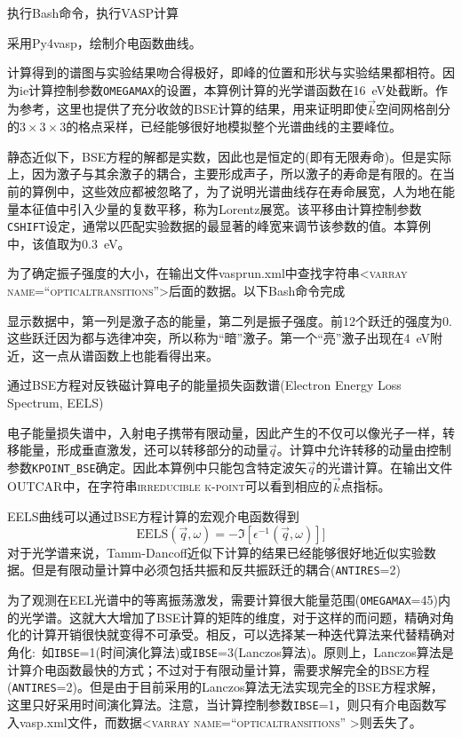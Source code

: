 执行\textrm{Bash}命令，执行\textrm{VASP}计算

采用\textrm{Py4vasp}，绘制介电函数曲线。

计算得到的谱图与实验结果吻合得极好，即峰的位置和形状与实验结果都相符。因为ie计算控制参数\texttt{OMEGAMAX}的设置，本算例计算的光学谱函数在\textrm{16~eV}处截断。作为参考，这里也提供了充分收敛的\textrm{BSE}计算的结果，用来证明即使$\vec k$空间网格剖分的$3\times3\times3$的格点采样，已经能够很好地模拟整个光谱曲线的主要峰位。

静态近似下，\textrm{BSE}方程的解都是实数，因此也是恒定的(即有无限寿命)。但是实际上，因为激子与其余激子的耦合，主要形成声子，所以激子的寿命是有限的。在当前的算例中，这些效应都被忽略了，为了说明光谱曲线存在寿命展宽，人为地在能量本征值中引入少量的复数平移，称为\textrm{Lorentz}展宽。该平移由计算控制参数\texttt{CSHIFT}设定，通常以匹配实验数据的最显著的峰宽来调节该参数的值。本算例中，该值取为\textrm{0.3~eV}。

为了确定振子强度的大小，在输出文件\textrm{vasprun.xml}中查找字符串\textsc{<varray name=``opticaltransitions''>}后面的数据。以下\textrm{Bash}命令完成

显示数据中，第一列是激子态的能量，第二列是振子强度。前12个跃迁的强度为0.这些跃迁因为都与选律冲突，所以称为``暗''激子。第一个``亮''激子出现在\textrm{4~eV}附近，这一点从谱函数上也能看得出来。

通过\textrm{BSE}方程对反铁磁计算电子的能量损失函数谱\textrm{(Electron Energy Loss Spectrum, EELS)}

电子能量损失谱中，入射电子携带有限动量，因此产生的不仅可以像光子一样，转移能量，形成垂直激发，还可以转移部分的动量$\vec q$。计算中允许转移的动量由控制参数\texttt{KPOINT\_BSE}确定。因此本算例中只能包含特定波矢$\vec q$的光谱计算。在输出文件\textrm{OUTCAR}中，在字符串\textsc{irreducible k-point}可以看到相应的$\vec k$点指标。

\textrm{EELS}曲线可以通过\textrm{BSE}方程计算的宏观介电函数得到
\begin{displaymath}
	\mathrm{EELS}(\vec q,\omega)=-\Im\left[ \epsilon^{-1}(\vec q,\omega) \right]]
\end{displaymath}
对于光学谱来说，\textrm{Tamm-Dancoff}近似下计算的结果已经能够很好地近似实验数据。但是有限动量计算中必须包括共振和反共振跃迁的耦合\textrm{(\texttt{ANTIRES}=2)}

为了观测在\textrm{EEL}光谱中的等离振荡激发，需要计算很大能量范围\textrm{(\texttt{OMEGAMAX}=45)}内的光学谱。这就大大增加了\textrm{BSE}计算的矩阵的维度，对于这样的而问题，精确对角化的计算开销很快就变得不可承受。相反，可以选择某一种迭代算法来代替精确对角化:~如\texttt{IBSE}=1(时间演化算法)或\texttt{IBSE}=3(\textrm{Lanczos}算法)。原则上，\textrm{Lanczos}算法是计算介电函数最快的方式；不过对于有限动量计算，需要求解完全的\textrm{BSE}方程(\texttt{ANTIRES}=2)。但是由于目前采用的\textrm{Lanczos}算法无法实现完全的\textrm{BSE}方程求解，这里只好采用时间演化算法。注意，当计算控制参数\texttt{IBSE}=1，则只有介电函数写入\textrm{vasp.xml}文件，而数据\textsc{<varray name=``opticaltransitions'' >}则丢失了。

